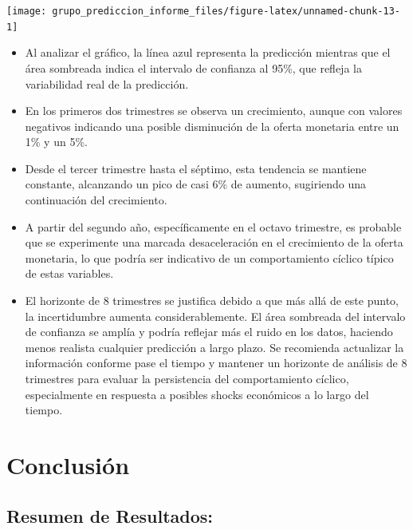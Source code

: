 \documentclass[
  12pt,
]{article}
\begin{document}
\begin{center}\texttt{[image: grupo\_prediccion\_informe\_files/figure-latex/unnamed-chunk-13-1]} \end{center}

\begin{itemize}
\item
  Al analizar el gráfico, la línea azul representa la predicción
  mientras que el área sombreada indica el intervalo de confianza al
  95\%, que refleja la variabilidad real de la predicción.
\item
  En los primeros dos trimestres se observa un crecimiento, aunque con
  valores negativos indicando una posible disminución de la oferta
  monetaria entre un 1\% y un 5\%.
\item
  Desde el tercer trimestre hasta el séptimo, esta tendencia se mantiene
  constante, alcanzando un pico de casi 6\% de aumento, sugiriendo una
  continuación del crecimiento.
\item
  A partir del segundo año, específicamente en el octavo trimestre, es
  probable que se experimente una marcada desaceleración en el
  crecimiento de la oferta monetaria, lo que podría ser indicativo de un
  comportamiento cíclico típico de estas variables.
\item
  El horizonte de 8 trimestres se justifica debido a que más allá de
  este punto, la incertidumbre aumenta considerablemente. El área
  sombreada del intervalo de confianza se amplía y podría reflejar más
  el ruido en los datos, haciendo menos realista cualquier predicción a
  largo plazo. Se recomienda actualizar la información conforme pase el
  tiempo y mantener un horizonte de análisis de 8 trimestres para
  evaluar la persistencia del comportamiento cíclico, especialmente en
  respuesta a posibles shocks económicos a lo largo del tiempo. \newpage
\end{itemize}

\section{Conclusión}\label{conclusiuxf3n}

\subsection{Resumen de Resultados:}\label{resumen-de-resultados}
\end{document}
